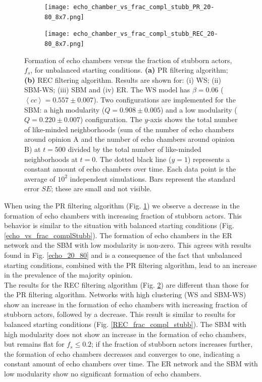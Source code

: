 \documentclass[11 pt , letterpaper , twoside , openright]{book}
\begin{document}
\begin{figure}[H]
  \begin{subfigure}[b]{0.49\textwidth}
    \caption{}
  	\texttt{[image: echo\_chamber\_vs\_frac\_compl\_stubb\_PR\_20-80\_8x7.png]}
    \label{PR_frac_compl_stubb_20-80}
  \end{subfigure}
  \begin{subfigure}[b]{0.49\textwidth}
    \caption{}
  	\texttt{[image: echo\_chamber\_vs\_frac\_compl\_stubb\_REC\_20-80\_8x7.png]}
    \label{REC_frac_compl_stubb_20-80}
  \end{subfigure}
  \captionsetup{format=plain}
  \caption[Formation of echo chambers versus fraction of stubborn actors for the PR and REC filtering algorithms and unbalanced starting conditions.]{Formation of echo chambers versus the fraction of stubborn actors, $f_s$, for unbalanced starting conditions. \textbf{(a)} PR filtering algorithm; \textbf{(b)} REC filtering algorithm. Results are shown for: (i) WS; (ii) SBM-WS; (iii) SBM and (iv) ER. The WS model has $\beta = 0.06$ ($\left<cc\right> = 0.557 \pm 0.007$). Two configurations are implemented for the SBM: a high modularity ($Q = 0.908 \pm 0.005$) and a low modularity ($Q = 0.220 \pm 0.007$) configuration. The $y$-axis shows the total number of like-minded neighborhoods (sum of the number of echo chambers around opinion A and the number of echo chambers around opinion B) at $t=500$ divided by the total number of like-minded neighborhoods at $t=0$. The dotted black line ($y=1$) represents a constant amount of echo chambers over time. Each data point is the average of $10^2$ independent simulations. Bars represent the standard error $SE$; these are small and not visible.}
\label{echo_vs_frac_complStubb_PR-REC_20-80}
\end{figure}
\noindent
When using the PR filtering algorithm (Fig. \ref{PR_frac_compl_stubb_20-80}) we observe a decrease in the formation of echo chambers with increasing fraction of stubborn actors. This behavior is similar to the situation with balanced starting conditions (Fig. \ref{echo_vs_frac_complStubb}). The formation of echo chambers in the ER network and the SBM with low modularity is non-zero. This agrees with results found in Fig. \ref{echo_20_80} and is a consequence of the fact that unbalanced starting conditions, combined with the PR filtering algorithm, lead to an increase in the prevalence of the majority opinion. \\
\newline
The results for the REC filtering algorithm (Fig. \ref{REC_frac_compl_stubb_20-80}) are different than those for the PR filtering algorithm. Networks with high clustering (WS and SBM-WS) show an increase in the formation of echo chambers with increasing fraction of stubborn actors, followed by a decrease. This result is similar to results for balanced starting conditions (Fig. \ref{REC_frac_compl_stubb}). The SBM with high modularity does not show an increase in the formation of echo chambers, but remains flat for $f_s \leqslant 0.2$; if the fraction of stubborn actors increases further, the formation of echo chambers decreases and converges to one, indicating a constant amount of echo chambers over time. The ER network and the SBM with low modularity show no significant formation of echo chambers.\\
\end{document}
